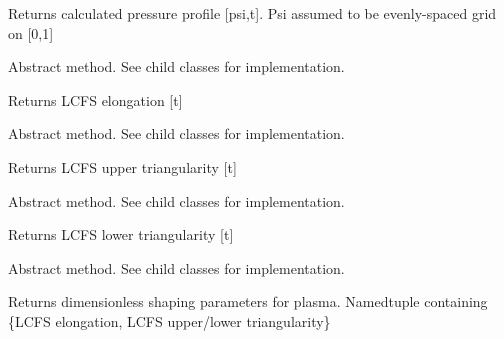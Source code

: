 \documentclass[letterpaper,10pt,english]{sphinxmanual}
\begin{document}
\begin{fulllineitems}
\begin{fulllineitems}
Returns calculated pressure profile {[}psi,t{]}.
Psi assumed to be evenly-spaced grid on {[}0,1{]}

\end{fulllineitems}


\begin{fulllineitems}
\label{eqtools:eqtools.core.Equilibrium.getElongation}
Abstract method.  See child classes for implementation.

Returns LCFS elongation {[}t{]}

\end{fulllineitems}


\begin{fulllineitems}
\label{eqtools:eqtools.core.Equilibrium.getUpperTriangularity}
Abstract method.  See child classes for implementation.

Returns LCFS upper triangularity {[}t{]}

\end{fulllineitems}


\begin{fulllineitems}
\label{eqtools:eqtools.core.Equilibrium.getLowerTriangularity}
Abstract method.  See child classes for implementation.

Returns LCFS lower triangularity {[}t{]}

\end{fulllineitems}


\begin{fulllineitems}
\label{eqtools:eqtools.core.Equilibrium.getShaping}
Abstract method.  See child classes for implementation.

Returns dimensionless shaping parameters for plasma.
Namedtuple containing \{LCFS elongation, LCFS upper/lower triangularity\}

\end{fulllineitems}



\end{fulllineitems}
\end{document}
